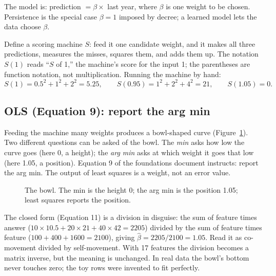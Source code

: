 \documentclass[11pt]{article}
\begin{document}
The model is: prediction $= \beta \times$ last year, where $\beta$ is one
weight to be chosen. Persistence is the special case $\beta = 1$ imposed
by decree; a learned model lets the data choose $\beta$.

Define a scoring machine $S$: feed it one candidate weight, and it makes
all three predictions, measures the misses, squares them, and adds them
up. The notation $S(1)$ reads ``$S$ of 1,'' the machine's score for the
input 1; the parentheses are function notation, not multiplication.
Running the machine by hand:
\[
S(1) = 0.5^2 + 1^2 + 2^2 = 5.25, \qquad
S(0.95) = 1^2 + 2^2 + 4^2 = 21, \qquad
S(1.05) = 0 .
\]

\subsection{OLS (Equation 9): report the arg min}

Feeding the machine many weights produces a bowl-shaped curve
(Figure~\ref{fig:bowl}). Two different questions can be asked of the
bowl. The \emph{min} asks how low the curve goes (here 0, a height); the
\emph{arg min} asks at which weight it goes that low (here 1.05, a
position). Equation 9 of the foundations document instructs: report the
arg min. The output of least squares is a weight, not an error value.

\begin{figure}[ht]
\centering
{}
\caption{The bowl. The min is the height 0; the arg min is the position
1.05; least squares reports the position.}
\label{fig:bowl}
\end{figure}

The closed form (Equation 11) is a division in disguise: the sum of
feature times answer ($10 \times 10.5 + 20 \times 21 + 40 \times 42 =
2205$) divided by the sum of feature times feature ($100 + 400 + 1600 =
2100$), giving $\hat\beta = 2205/2100 = 1.05$. Read it as co-movement
divided by self-movement. With 17 features the division becomes a matrix
inverse, but the meaning is unchanged. In real data the bowl's bottom
never touches zero; the toy rows were invented to fit perfectly.
\end{document}
